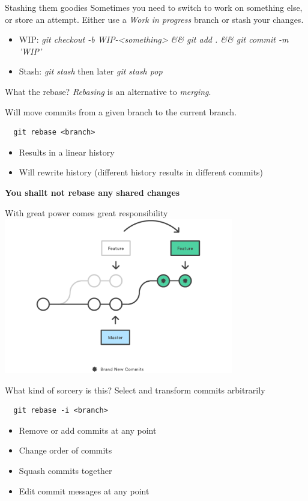\documentclass[10pt]{beamer}
\begin{document}
\begin{frame}{Stashing them goodies}
  Sometimes you need to switch to work on something else, or store an attempt.
  Either use a \textit{Work in progress} branch or stash your changes.
  \begin{itemize}
  \item WIP: \textit{git checkout -b WIP-<something> \&\& git add . \&\& git commit -m 'WIP'}
    \item Stash: \textit{git stash} then later \textit{git stash pop}
  \end{itemize}
\end{frame}

\begin{frame}[fragile]{What the rebase?}
  \textit{Rebasing} is an alternative to \textit{merging}.

  Will move commits from a given branch to the current branch.

  \begin{lstlisting}
  git rebase <branch>
  \end{lstlisting}

  \begin{itemize}
		\item Results in a linear history
		\item Will rewrite history (different history results in different commits)
	\end{itemize}

  \textbf{You shallt not rebase any shared changes}

  With great power comes great responsibility
  \includegraphics[width=0.75\textwidth]{rebase}
\end{frame}

\begin{frame}[fragile]{What kind of sorcery is this?}
  Select and transform commits arbitrarily 

  \begin{lstlisting}
  git rebase -i <branch>
  \end{lstlisting}

  \begin{itemize}
		\item Remove or add commits at any point
		\item Change order of commits
    \item Squash commits together
		\item Edit commit messages at any point
	\end{itemize}
\end{frame}
\end{document}
